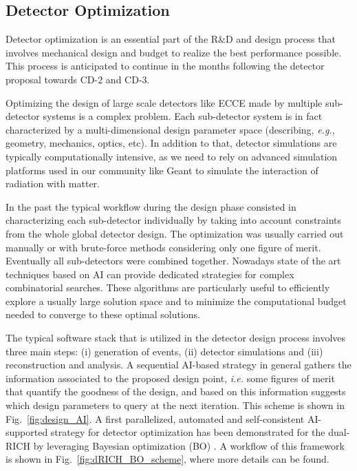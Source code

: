 \subsection{Detector Optimization}
\label{sec:codesign}


Detector optimization is an essential part of the R\&D and design process that involves mechanical design and budget to realize the best performance possible.  
This process is anticipated to continue in the months following the detector proposal towards CD-2 and CD-3. 

Optimizing the design of large scale detectors like ECCE made by multiple sub-detector systems is a complex problem. 
Each sub-detector system is in fact characterized by a multi-dimensional design parameter space (describing, \textit{e.g.}, geometry, mechanics, optics, etc). 
In addition to that, detector simulations are typically computationally intensive, as we need to rely on advanced simulation platforms used in our community like Geant \cite{Agostinelli:2002hh} to simulate the interaction of radiation with matter. 

In the past the typical workflow during the design phase consisted in characterizing each sub-detector individually by taking into account constraints from the whole global detector design.
The optimization was usually carried out manually or with brute-force methods considering only one figure of merit. Eventually all sub-detectors were combined together.
Nowadays state of the art techniques based on AI can provide dedicated strategies for complex combinatorial searches. 
These algorithms are particularly useful to efficiently explore a usually large solution space and to minimize the computational budget needed to converge to these optimal solutions. 

The typical software stack that is utilized in the detector design process involves three main steps:
(i) generation of events, (ii) detector simulations
and (iii) reconstruction and analysis. 
%
A sequential AI-based strategy in general gathers the information associated to the proposed design point, \textit{i.e.} some figures of merit that quantify the goodness of the design, and based on this information suggests which design parameters to query at the next iteration. This scheme is shown in Fig.~\ref{fig:design_AI}. 
%
A first parallelized, automated and self-consistent AI-supported strategy for detector optimization has been demonstrated for the dual-RICH by \cite{cisbani2020ai} leveraging Bayesian optimization (BO) \cite{snoek2012practical}. 
A workflow of this framework is shown in Fig.~\ref{fig:dRICH_BO_scheme}, where more details can be found. 



